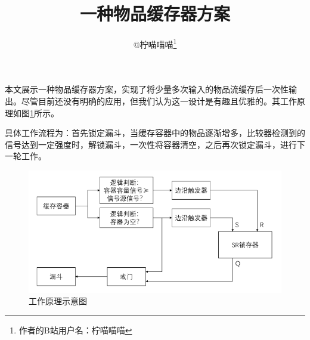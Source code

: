 \documentclass[UTF8,12pt,punct=kaiming,fontset=none]{ctexart}
\title{\vspace{-1.5cm}一种物品缓存器方案\vspace{-0.5cm}}
\author{@柠喵喵喵\thanks{作者的B站用户名：柠喵喵喵}}
\date{}
\begin{document}
\hypersetup{bookmarksdepth=-1}  %
\maketitle
\thispagestyle{fancy}  %
\vspace{-0.7cm}

\titleformat{\section}[hang]{\large\sffamily\bfseries}{\textmd{\thesection}}{0.5cm}{}
\titlespacing{\section}{0cm}{0.5ex}{0.2ex}
\titleformat{\subsection}[hang]{\normalsize\sffamily}{\textmd{\thesubsection}}{0.5cm}{}
\titlespacing{\subsection}{0cm}{0.5ex}{0.2ex}
\setcounter{section}{0}

本文展示一种物品缓存器方案，实现了将少量多次输入的物品流缓存后一次性输出。尽管目前还没有明确的应用，但我们认为这一设计是有趣且优雅的。其工作原理如图\ref{fig:1}所示。

具体工作流程为：首先锁定漏斗，当缓存容器中的物品逐渐增多，比较器检测到的信号达到一定强度时，解锁漏斗，一次性将容器清空，之后再次锁定漏斗，进行下一轮工作。

\begin{figure}[h]
    \centering
    \includegraphics[width=.6\textwidth]{图1.png}
    \caption{工作原理示意图}
    \label{fig:1}
\end{figure}
\end{document}
